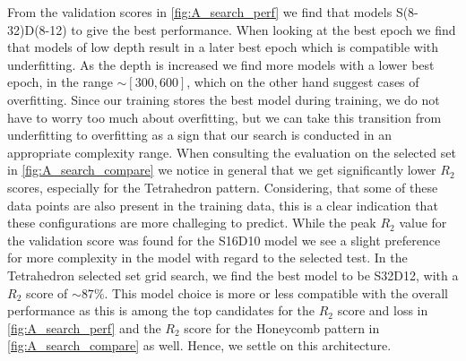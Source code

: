 From the validation scores in \cref{fig:A_search_perf} we find that models
S(8-32)D(8-12) to give the best performance. When looking at the best epoch we
find that models of low depth result in a later best epoch which is compatible
with underfitting. As the depth is increased we find more models with a lower
best epoch, in the range $\sim [300, 600]$, which on the other hand suggest
cases of overfitting. Since our training stores the best model during training,
we do not have to worry too much about overfitting, but we can take this
transition from underfitting to overfitting as a sign that our search is
conducted in an appropriate complexity range. When consulting the evaluation on the
selected set in \cref{fig:A_search_compare} we notice in general that we get
significantly lower $R_2$ scores, especially for the Tetrahedron pattern. Considering, that some of these data points are also present in the training data, this is a clear indication that these configurations are more challeging to predict. While the peak $R_2$ value for the validation score was found for the S16D10 model we see a slight preference for more complexity in the model with regard to the selected test. In the Tetrahedron selected set grid search, we find the best model to be S32D12, with a $R_2$ score of $\sim 87 \%$. This model choice is more or less compatible with the overall performance as this is among the top candidates for the $R_2$ score and loss in \cref{fig:A_search_perf} and the $R_2$ score for the Honeycomb pattern in \cref{fig:A_search_compare} as well. Hence, we settle on this architecture.


